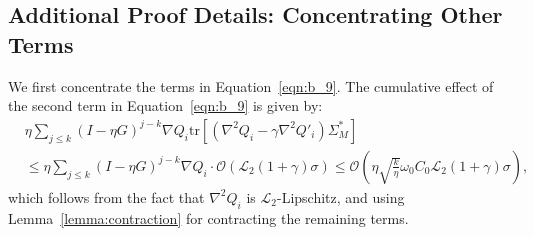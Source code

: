 \subsection{Additional Proof Details: Concentrating Other Terms}
\label{app:concentrating}
We first concentrate the terms in Equation~\ref{eqn:b_9}. The cumulative effect of the second term in Equation~\ref{eqn:b_9} is given by:
\begin{align}
    &\eta \sum_{j \leq k} (I - \eta G)^{j-k} \nabla Q_i \mathrm{tr}\left[ (\nabla^2 Q_i - \gamma \nabla^2 Q'_i) \Sigma^*_M \right]\\ 
    &\leq \eta \sum_{j \leq k} (I - \eta G)^{j-k} \nabla Q_i \cdot \mathcal{O}\left( \mathscr{L}_2 (1+ \gamma) \sigma \right) \leq \mathcal{O}\left( \eta \sqrt{\frac{k}{\eta}} \omega_0 C_0  \mathscr{L}_2 (1 + \gamma) \sigma \right), 
\end{align}
which follows from the fact that $\nabla^2 Q_i$ is $\mathscr{L}_2$-Lipschitz, and using Lemma~\ref{lemma:contraction} for contracting the remaining terms.

